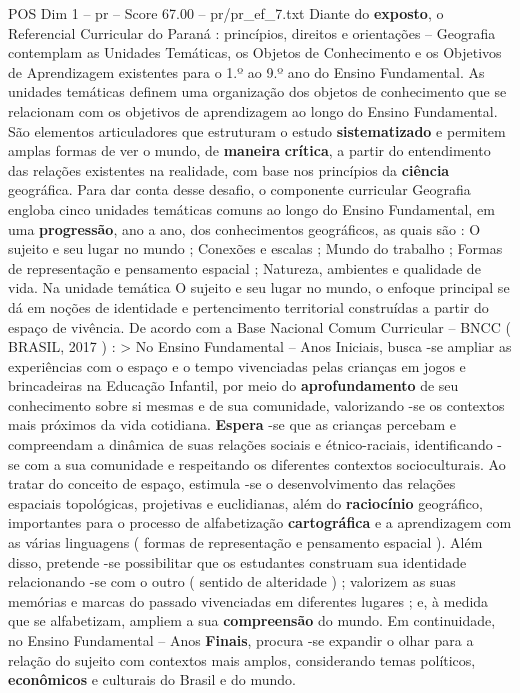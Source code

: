 \begin{textsample}{POS Dim 1 – pr – Score 67.00 – pr/pr\_ef\_7.txt}
Diante do \textbf{exposto}, o Referencial Curricular do Paraná : princípios, direitos e orientações – Geografia contemplam as Unidades Temáticas, os Objetos de Conhecimento e os Objetivos de Aprendizagem existentes para o 1.º ao 9.º ano do Ensino Fundamental.
As unidades temáticas definem uma organização dos objetos de conhecimento que se relacionam com os objetivos de aprendizagem ao longo do Ensino Fundamental.
São elementos articuladores que estruturam o estudo \textbf{sistematizado} e permitem amplas formas de ver o mundo, de \textbf{maneira} \textbf{crítica}, a partir do entendimento das relações existentes na realidade, com base nos princípios da \textbf{ciência} geográfica.
Para dar conta desse desafio, o componente curricular Geografia engloba cinco unidades temáticas comuns ao longo do Ensino Fundamental, em uma \textbf{progressão}, ano a ano, dos conhecimentos geográficos, as quais são : O sujeito e seu lugar no mundo ; Conexões e escalas ; Mundo do trabalho ; Formas de representação e pensamento espacial ; Natureza, ambientes e qualidade de vida.
Na unidade temática O sujeito e seu lugar no mundo, o enfoque principal se dá em noções de identidade e pertencimento territorial construídas a partir do espaço de vivência.
De acordo com a Base Nacional Comum Curricular – BNCC ( BRASIL, 2017 ) : > No Ensino Fundamental – Anos Iniciais, busca -se ampliar as experiências com o espaço e o tempo vivenciadas pelas crianças em jogos e brincadeiras na Educação Infantil, por meio do \textbf{aprofundamento} de seu conhecimento sobre si mesmas e de sua comunidade, valorizando -se os contextos mais próximos da vida cotidiana. \textbf{Espera} -se que as crianças percebam e compreendam a dinâmica de suas relações sociais e étnico-raciais, identificando -se com a sua comunidade e respeitando os diferentes contextos socioculturais.
Ao tratar do conceito de espaço, estimula -se o desenvolvimento das relações espaciais topológicas, projetivas e euclidianas, além do \textbf{raciocínio} geográfico, importantes para o processo de alfabetização \textbf{cartográfica} e a aprendizagem com as várias linguagens ( formas de representação e pensamento espacial ).
Além disso, pretende -se possibilitar que os estudantes construam sua identidade relacionando -se com o outro ( sentido de alteridade ) ; valorizem as suas memórias e marcas do passado vivenciadas em diferentes lugares ; e, à medida que se alfabetizam, ampliem a sua \textbf{compreensão} do mundo.
Em continuidade, no Ensino Fundamental – Anos \textbf{Finais}, procura -se expandir o olhar para a relação do sujeito com contextos mais amplos, considerando temas políticos, \textbf{econômicos} e culturais do Brasil e do mundo.

\end{textsample}
